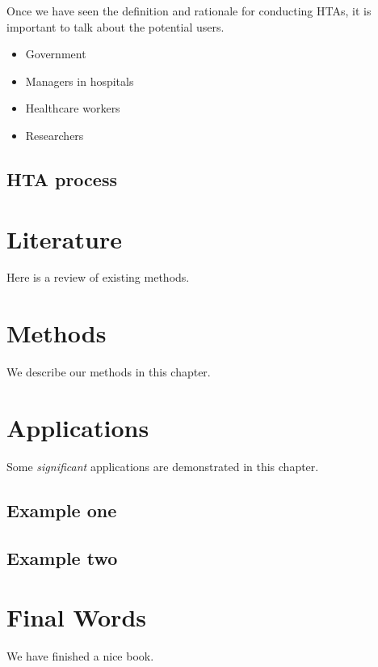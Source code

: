 \documentclass[
]{book}
\providecommand{\tightlist}{%
  \setlength{\itemsep}{0pt}\setlength{\parskip}{0pt}}
\begin{document}
Once we have seen the definition and rationale for conducting HTAs, it is important to talk about the potential users.

\begin{itemize}
\tightlist
\item
  Government
\item
  Managers in hospitals
\item
  Healthcare workers
\item
  Researchers
\end{itemize}

\hypertarget{hta-process}{%
\section{HTA process}\label{hta-process}}

\hypertarget{literature}{%
\chapter{Literature}\label{literature}}

Here is a review of existing methods.

\hypertarget{methods}{%
\chapter{Methods}\label{methods}}

We describe our methods in this chapter.

\hypertarget{applications}{%
\chapter{Applications}\label{applications}}

Some \emph{significant} applications are demonstrated in this chapter.

\hypertarget{example-one}{%
\section{Example one}\label{example-one}}

\hypertarget{example-two}{%
\section{Example two}\label{example-two}}

\hypertarget{final-words}{%
\chapter{Final Words}\label{final-words}}

We have finished a nice book.

  
\end{document}
